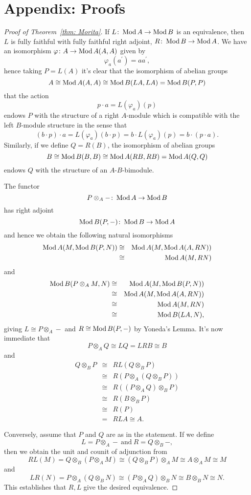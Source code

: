 \documentclass[reqno, 12pt]{amsart}
\begin{document}
\section{Appendix: Proofs}
\begin{proof}[Proof of Theorem~\ref{thm: Morita}]
  If $L \colon \operatorname{Mod}A \to \operatorname{Mod}B$ is an equivalence, then $L$ is fully faithful with fully faithful right adjoint, $R \colon \operatorname{Mod}B \to \operatorname{Mod}A$.
  We have an isomorphism $\varphi \colon A \to \operatorname{Mod}A(A,A)$ given by
  $$\varphi_a(a^\prime) = aa^\prime,$$
  hence taking $P = L(A)$ it's clear that the isomorphism of abelian groups
  $$A \cong \operatorname{Mod}A(A,A) \cong \operatorname{Mod}B(LA, LA) = \operatorname{Mod}B(P,P)$$
  that the action
  $$p \cdot a = L(\varphi_a)(p)$$
  endows $P$ with the structure of a right $A$-module which is compatible with the left $B$-module structure in the sense that
  $$(b\cdot p)\cdot a = L(\varphi_a)(b \cdot p) = b \cdot L(\varphi_a)(p) = b \cdot (p \cdot a).$$
  Similarly, if we define $Q = R(B)$, the isomorphism of abelian groups
  $$B \cong \operatorname{Mod}B(B,B) \cong \operatorname{Mod}A(RB,RB) = \operatorname{Mod}A(Q,Q)$$
  endows $Q$ with the structure of an $A$-$B$-bimodule.

  The functor
  $$P \otimes_A - \colon \operatorname{Mod}A \to \operatorname{Mod}B$$
  has right adjoint
  $$\operatorname{Mod}B(P, -) \colon \operatorname{Mod}B \to \operatorname{Mod}A$$
  and hence we obtain the following natural isomorphisms
  \begin{eqnarray*}
    \operatorname{Mod}A(M, \operatorname{Mod}B(P,N)) &\cong& \operatorname{Mod}A(M, \operatorname{Mod}A(A,RN))\\
    &\cong& \operatorname{Mod}A(M, RN)
  \end{eqnarray*}
  and
  \begin{eqnarray*}
    \operatorname{Mod}B(P \otimes_A M, N) &\cong& \operatorname{Mod}A(M, \operatorname{Mod}B(P,N))\\
    &\cong& \operatorname{Mod}A(M, \operatorname{Mod}A(A, RN))\\
    &\cong& \operatorname{Mod}A(M,RN)\\
    &\cong& \operatorname{Mod}B(LA, N),
  \end{eqnarray*}
  giving  $L \cong P \otimes_A -$ and $R \cong \operatorname{Mod}B(P, -)$ by Yoneda's Lemma.
  It's now immediate that
  $$P \otimes_A Q \cong LQ = LRB \cong B$$
  and
  \begin{eqnarray*}
    Q \otimes_B P &\cong& RL(Q \otimes_BP)\\
    &\cong& R(P \otimes_A (Q \otimes_B P))\\
    &\cong& R((P \otimes_A Q) \otimes_B P)\\
    &\cong& R(B \otimes_B P)\\
    &\cong& R(P)\\
    &=& RLA \cong A.
  \end{eqnarray*}

  Conversely, assume that $P$ and $Q$ are as in the statement.
  If we define $$L = P \otimes_A -\ \text{and}\ R = Q \otimes_B -,$$ then we obtain the unit and counit of adjunction from
  $$RL(M) = Q \otimes_B (P \otimes_A M) \cong (Q \otimes_B P) \otimes_A M \cong A \otimes_A M \cong M$$
  and
  $$LR(N) = P \otimes_A (Q \otimes_B N) \cong (P \otimes_A Q) \otimes_B N \cong B \otimes_B N \cong N.$$
  This establishes that $R,L$ give the desired equivalence.
\end{proof}
\end{document}
